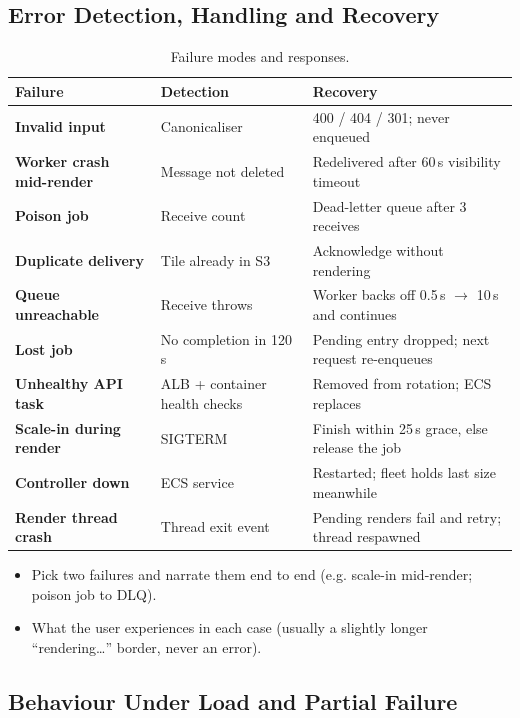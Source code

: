 \documentclass[a4paper,12pt]{article}
\begin{document}
\subsection{Error Detection, Handling and Recovery}

\begin{table}[H]
\centering
\small
\begin{tabularx}{\linewidth}{>{\bfseries}p{3.3cm} X X}
\toprule
Failure & Detection & Recovery \\
\midrule
Invalid input & Canonicaliser & 400 / 404 / 301; never enqueued \\
Worker crash mid-render & Message not deleted & Redelivered after 60\,s visibility timeout \\
Poison job & Receive count & Dead-letter queue after 3 receives \\
Duplicate delivery & Tile already in S3 & Acknowledge without rendering \\
Queue unreachable & Receive throws & Worker backs off 0.5\,s $\rightarrow$ 10\,s and continues \\
Lost job & No completion in 120\,s & Pending entry dropped; next request re-enqueues \\
Unhealthy API task & ALB + container health checks & Removed from rotation; ECS replaces \\
Scale-in during render & SIGTERM & Finish within 25\,s grace, else release the job \\
Controller down & ECS service & Restarted; fleet holds last size meanwhile \\
Render thread crash & Thread exit event & Pending renders fail and retry; thread respawned \\
\bottomrule
\end{tabularx}
\caption{Failure modes and responses.}
\label{tab:failures}
\end{table}

\begin{yourwriting}
\begin{itemize}
    \item Pick two failures and narrate them end to end (e.g. scale-in mid-render; poison job to DLQ).
    \item What the user experiences in each case (usually a slightly longer ``rendering\ldots'' border, never an error).
\end{itemize}
\end{yourwriting}

\subsection{Behaviour Under Load and Partial Failure}
\end{document}

